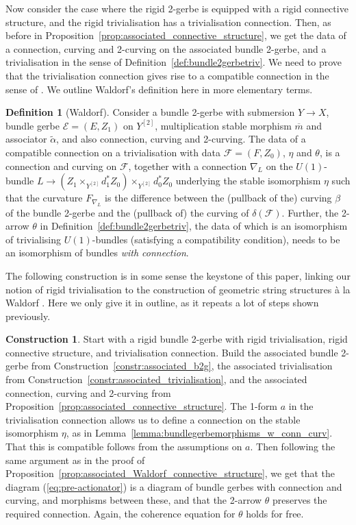 \documentclass[12pt]{amsart}
\theoremstyle{plain}
\theoremstyle{definition}
\newtheorem{definition}[theorem]{Definition}
\newtheorem{construction}[theorem]{Construction}
\theoremstyle{remark}
\numberwithin{equation}{section}
\newcommand{\cE}{{\mathcal E}}
\newcommand{\cF}{{\mathcal F}}
\newcommand{\<}{\langle}
\renewcommand{\>}{\rangle}
\begin{document}
Now consider the case where the rigid 2-gerbe is equipped with a rigid connective structure, and the rigid trivialisation has a trivialisation connection. 
Then, as before in Proposition~\ref{prop:associated_connective_structure}, we get the data of a connection, curving and 2-curving on the associated bundle 2-gerbe, and a trivialisation in the sense of Definition~\ref{def:bundle2gerbetriv}.
We need to prove that the trivialisation connection gives rise to a compatible connection in the sense of \cite[Definition~4.3]{Wal}.
We outline Waldorf's definition here in more elementary terms.


\begin{definition}[Waldorf]
\label{def:weak_trivialisation_connection}
Consider a bundle 2-gerbe with submersion $Y\to X$, bundle gerbe $\cE=(E,Z_1)$ on $Y^{[2]}$, multiplication stable morphism $\overline{m}$ and associator $\tilde \alpha$, and also connection, curving and 2-curving.
The data of a compatible connection on a trivialisation with data $\cF=(F,Z_0)$, $\eta$ and $\theta$, is a connection and curving on $\cF$, together with a connection $\nabla_L$ on the $U(1)$-bundle $L\to (Z_1\times_{Y^{[2]}}d_1^*Z_0) \times_{Y^{[2]}}d_0^*Z_0$ underlying the stable isomorphism $\eta$ such that the curvature $F_{\nabla_L}$ is the difference between the (pullback of the) curving $\beta$ of the bundle 2-gerbe and the (pullback of) the curving of $\delta(\cF)$. 
Further, the 2-arrow $\theta$ in Definition~\ref{def:bundle2gerbetriv}, the data of which is an isomorphism of trivialising $U(1)$-bundles (satisfying a compatibility condition), needs to be an isomorphism of bundles \emph{with connection}. 
\end{definition}


The following construction is in some sense the keystone of this paper, linking our notion of rigid trivialisation to the construction of geometric string structures \`a la Waldorf \cite{Wal}.
Here we only give it in outline, as it repeats a lot of steps shown previously.


\begin{construction}
Start with a rigid bundle 2-gerbe with rigid trivialisation, rigid connective structure, and trivialisation connection. 
Build the associated bundle 2-gerbe from Construction~\ref{constr:associated_b2g}, the associated trivialisation from Construction~\ref{constr:associated_trivialisation}, and the associated connection, curving and 2-curving from Proposition~\ref{prop:associated_connective_structure}. 
The 1-form $a$ in the trivialisation connection allows us to define a connection on the stable isomorphism $\eta$, as in Lemma~\ref{lemma:bundlegerbemorphisms_w_conn_curv}.
That this is compatible follows from the assumptions on $a$.
Then following the same argument as in the proof of Proposition~\ref{prop:associated_Waldorf_connective_structure}, we get that the diagram (\ref{eq:pre-actionator}) is a diagram of bundle gerbes with connection and curving, and morphisms between these, and that the 2-arrow $\theta$ preserves the required connection.
Again, the coherence equation for $\theta$ holds for free.
\end{construction}
\end{document}
